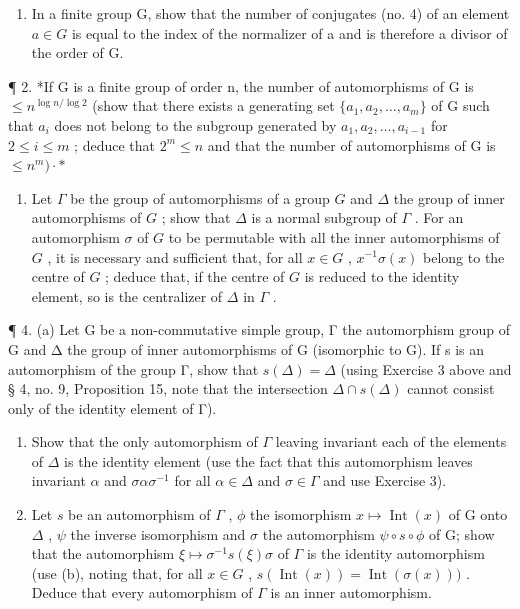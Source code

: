 \BourbakiExercisesSection

\begin{enumerate}
\def\labelenumi{\arabic{enumi}.}
\tightlist
\item
  In a finite group G, show that the number of conjugates (no. 4) of an element \(a \in G\) is equal to the index of the normalizer of a and is therefore a divisor of the order of G.
\end{enumerate}

¶ 2. *If G is a finite group of order n, the number of automorphisms of G is \(\leqslant n^{\log n/\log 2}\) (show that there exists a generating set \(\{a_{1}, a_{2}, \ldots, a_{m}\}\) of G such that \(a_{i}\) does not belong to the subgroup generated by \(a_{1}, a_{2}, \ldots, a_{i-1}\) for \(2 \leqslant i \leqslant m\) ; deduce that \(2^{m} \leqslant n\) and that the number of automorphisms of G is \(\leqslant n^{m})\cdot*\)

\begin{enumerate}
\def\labelenumi{\arabic{enumi}.}
\setcounter{enumi}{2}
\tightlist
\item
  Let \(\Gamma\) be the group of automorphisms of a group \(G\) and \(\Delta\) the group of inner automorphisms of \(G\) ; show that \(\Delta\) is a normal subgroup of \(\Gamma\) . For an automorphism \(\sigma\) of \(G\) to be permutable with all the inner automorphisms of \(G\) , it is necessary and sufficient that, for all \(x \in G\) , \(x^{-1}\sigma(x)\) belong to the centre of \(G\) ; deduce that, if the centre of \(G\) is reduced to the identity element, so is the centralizer of \(\Delta\) in \(\Gamma\) .
\end{enumerate}

¶ 4. (a) Let G be a non-commutative simple group, Γ the automorphism group of G and Δ the group of inner automorphisms of G (isomorphic to G). If s is an automorphism of the group Γ, show that \(s(\Delta) = \Delta\) (using Exercise 3 above and § 4, no. 9, Proposition 15, note that the intersection \(\Delta \cap s(\Delta)\) cannot consist only of the identity element of Γ).

\begin{enumerate}
\def\labelenumi{(\alph{enumi})}
\setcounter{enumi}{1}
\item
  Show that the only automorphism of \(\Gamma\) leaving invariant each of the elements of \(\Delta\) is the identity element (use the fact that this automorphism leaves invariant \(\alpha\) and \(\sigma \alpha \sigma^{-1}\) for all \(\alpha \in \Delta\) and \(\sigma \in \Gamma\) and use Exercise 3).
\item
  Let \(s\) be an automorphism of \(\Gamma\) , \(\phi\) the isomorphism \(x \mapsto \operatorname{Int}(x)\) of G onto \(\Delta\) , \(\psi\) the inverse isomorphism and \(\sigma\) the automorphism \(\psi \circ s \circ \phi\) of G; show that the automorphism \(\xi \mapsto \sigma^{-1}s(\xi)\sigma\) of \(\Gamma\) is the identity automorphism (use (b), noting that, for all \(x \in G\) , \(s(\operatorname{Int}(x)) = \operatorname{Int}(\sigma(x)))\) . Deduce that every automorphism of \(\Gamma\) is an inner automorphism.
\end{enumerate}


